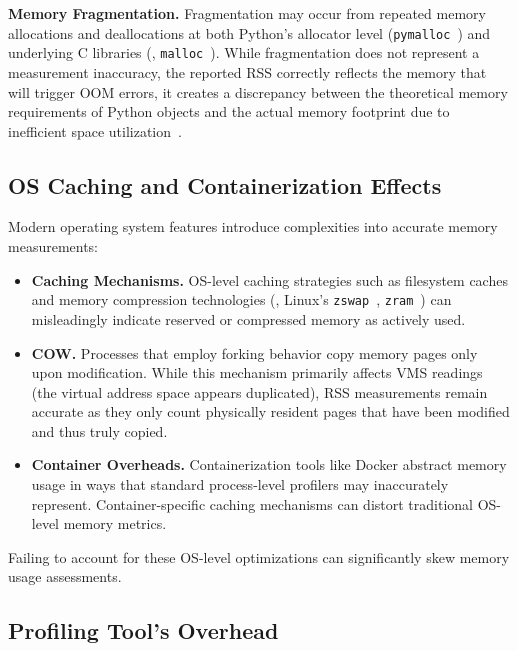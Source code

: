 \textbf{Memory Fragmentation.} Fragmentation may occur from repeated memory allocations and deallocations at both Python's allocator level (\texttt{pymalloc}~\cite{pymalloc}) and underlying C libraries (\eg, \texttt{malloc}~\cite{malloc}).
While fragmentation does not represent a measurement inaccuracy, the reported \ac{RSS} correctly reflects the memory that will trigger \ac{OOM} errors, it creates a discrepancy between the theoretical memory requirements of Python objects and the actual memory footprint due to inefficient space utilization~\cite{lamprakos2022impact}.

\subsection{\ac{OS} Caching and Containerization Effects}
\label{subsec:mmc-challenges-os-caching}

Modern operating system features introduce complexities into accurate memory measurements:

\begin{itemize}

    \item \textbf{Caching Mechanisms.} \ac{OS}-level caching strategies such as filesystem caches and memory compression technologies (\eg, Linux's \texttt{zswap}~\cite{zswap}, \texttt{zram}~\cite{zram}) can misleadingly indicate reserved or compressed memory as actively used.

    \item \textbf{\ac{COW}.} Processes that employ forking behavior copy memory pages only upon modification.
    While this mechanism primarily affects \ac{VMS} readings (the virtual address space appears duplicated), \ac{RSS} measurements remain accurate as they only count physically resident pages that have been modified and thus truly copied.

    \item \textbf{Container Overheads.} Containerization tools like Docker abstract memory usage in ways that standard process-level profilers may inaccurately represent.
    Container-specific caching mechanisms can distort traditional \ac{OS}-level memory metrics.
\end{itemize}

Failing to account for these \ac{OS}-level optimizations can significantly skew memory usage assessments.

\subsection{Profiling Tool's Overhead}
\label{subsec:mmc-challenges-tool-overhead}

